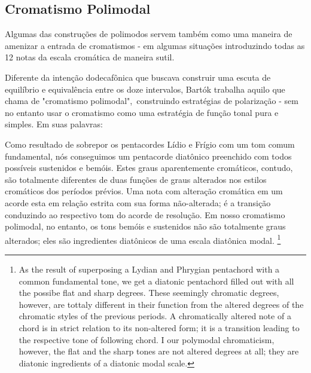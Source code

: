 \documentclass[
	12pt,				%
	openright,			%
	twoside,			%
	a4paper,			%
	english,			%
	french,				%
	spanish,			%
	brazil				%
	]{abntex2}
\begin{document}
\subsection{Cromatismo Polimodal}
\label{polimodal}

Algumas das construções de polimodos servem também como uma maneira de amenizar a entrada de cromatismos - em algumas situações introduzindo todas as 12 notas da escala cromática de maneira sutil. 

Diferente da intenção dodecafônica que buscava construir uma escuta de equilíbrio e equivalência entre os doze intervalos, Bartók trabalha aquilo que chama de "cromatismo polimodal",\ construindo estratégias de polarização - sem no entanto usar o cromatismo como uma estratégia de função tonal pura e simples. Em suas palavras:

\begin{citacao}
Como resultado de sobrepor os pentacordes Lídio e Frígio com um tom comum fundamental, nós conseguimos um pentacorde diatônico preenchido com todos possíveis sustenidos e bemóis. Estes graus aparentemente cromáticos, contudo, são totalmente diferentes de duas funções de graus alterados nos estilos cromáticos dos períodos prévios. Uma nota com alteração cromática em um acorde esta em relação estrita com sua forma não-alterada; é a transição conduzindo ao respectivo tom do acorde de resolução. Em nosso cromatismo polimodal, no entanto, os tons bemóis e sustenidos não são totalmente graus alterados; eles são ingredientes diatônicos de uma escala diatônica modal. \cite[p. 367]{bartok1993bela}\footnote{As the result of superposing a Lydian and Phrygian pentachord with a common fundamental tone, we get a diatonic pentachord filled out with all the possibe flat and sharp degrees. These seemingly chromatic degrees, however, are tottaly different in their function from the altered degrees of the chromatic styles of the previous periods. A chromatically altered note of a chord is in strict relation to its non-altered form; it is a transition leading to the respective tone of following chord. I our polymodal chromaticism, however, the flat and the sharp tones are not altered degrees at all; they are diatonic ingredients of a diatonic modal scale.\cite[p. 367]{bartok1993bela}}
\end{citacao}
\end{document}
